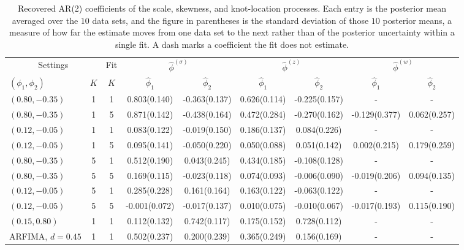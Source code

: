 \documentclass[12pt]{article}
\begin{document}
\begin{table}[htbp]
\centering
\caption[Recovered AR(2) coefficients]{Recovered AR(2) coefficients of the scale, skewness, and knot-location processes.  Each entry is the posterior mean averaged over the $10$ data sets, and the figure in parentheses is the standard deviation of those $10$ posterior means, a measure of how far the estimate moves from one data set to the next rather than of the posterior uncertainty within a single fit.  A dash marks a coefficient the fit does not estimate.}
\label{tab:ar2-coef-recovery}
\scriptsize
\begin{tabular}{@{}lcc cc cc cc@{}}
\toprule
\multicolumn{2}{c}{Settings} & Fit & \multicolumn{2}{c}{$\hat\phi^{(\sigma)}$} & \multicolumn{2}{c}{$\hat\phi^{(z)}$} & \multicolumn{2}{c}{$\hat\phi^{(w)}$}\\
\cmidrule(lr){1-2}\cmidrule(lr){4-5}\cmidrule(lr){6-7}\cmidrule(lr){8-9}
$(\phi_1,\phi_2)$ & $K$ & $K$ & $\hat\phi_1$ & $\hat\phi_2$ & $\hat\phi_1$ & $\hat\phi_2$ & $\hat\phi_1$ & $\hat\phi_2$\\
\midrule
$(0.80,-0.35)$ & 1 & 1 & 0.803(0.140) & -0.363(0.137) & 0.626(0.114) & -0.225(0.157) & -             & -            \\
$(0.80,-0.35)$ & 1 & 5 & 0.871(0.142) & -0.438(0.164) & 0.472(0.284) & -0.270(0.162) & -0.129(0.377) & 0.062(0.257) \\
$(0.12,-0.05)$ & 1 & 1 & 0.083(0.122) & -0.019(0.150) & 0.186(0.137) & 0.084(0.226)  & -             & -            \\
$(0.12,-0.05)$ & 1 & 5 & 0.095(0.141) & -0.050(0.220) & 0.050(0.088) & 0.051(0.142)  & 0.002(0.215)  & 0.179(0.259) \\
$(0.80,-0.35)$ & 5 & 1 & 0.512(0.190) & 0.043(0.245)  & 0.434(0.185) & -0.108(0.128) & -             & -            \\
$(0.80,-0.35)$ & 5 & 5 & 0.169(0.115) & -0.023(0.118) & 0.074(0.093) & -0.006(0.090) & -0.019(0.206) & 0.094(0.135) \\
$(0.12,-0.05)$ & 5 & 1 & 0.285(0.228) & 0.161(0.164)  & 0.163(0.122) & -0.063(0.122) & -             & -            \\
$(0.12,-0.05)$ & 5 & 5 & -0.001(0.072)& -0.017(0.137) & 0.010(0.075) & -0.010(0.067) & -0.017(0.193) & 0.115(0.190) \\
\midrule
$(0.15,0.80)$  & 1 & 1 & 0.112(0.132) & 0.742(0.117)  & 0.175(0.152) & 0.728(0.112)  & -             & -            \\
ARFIMA, $d{=}0.45$ & 1 & 1 & 0.502(0.237) & 0.200(0.239) & 0.365(0.249) & 0.156(0.169) & -            & -            \\
\bottomrule
\end{tabular}
\end{table}
\end{document}
